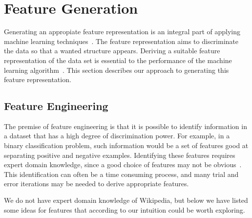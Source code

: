 \section{Feature Generation}\label{sec:feature_generation}
Generating an appropiate feature representation is an integral part of applying machine learning techniques~\cite{ng-lecture}. The feature representation aims to discriminate the data so that a wanted structure appears. Deriving a suitable feature representation of the data set is essential to the performance of the machine learning algorithm~\cite{ng-lecture}. This section describes our approach to generating this feature representation.



\subsection{Feature Engineering}
The premise of feature engineering is that it is possible to identify information in a dataset that has a high degree of discrimination power. For example, in a binary classification problem, such information would be a set of features good at separating positive and negative examples. Identifying these features requires expert domain knowledge, since a good choice of features may not be obvious~\cite{ng-lecture}. This identification can often be a time consuming process, and many trial and error iterations may be needed to derive appropriate features.

We do not have expert domain knowledge of Wikipedia, but below we have listed some ideas for features that according to our intuition could be worth exploring.

